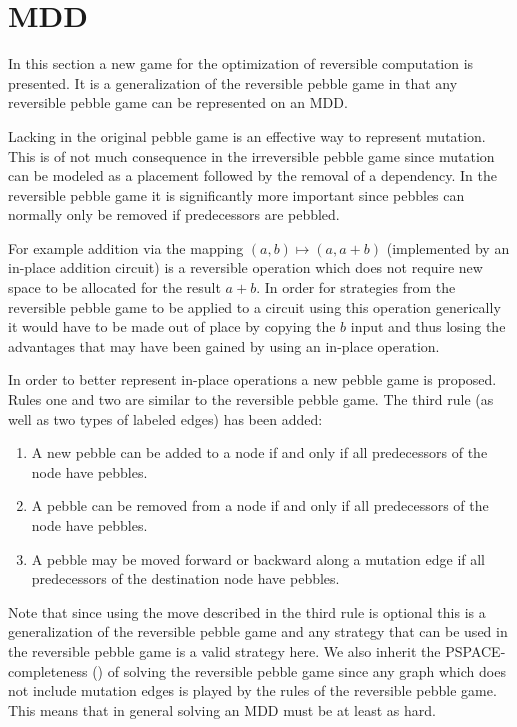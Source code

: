 \section{MDD}

In this section a new game for the optimization of reversible computation is
presented. It is a generalization of the reversible pebble game in that any
reversible pebble game can be represented on an MDD. 

Lacking in the original pebble game is an effective way to
represent mutation. This is of not much consequence in the irreversible pebble
game since mutation can be modeled as a placement followed by the removal of a
dependency. In the reversible pebble game it is significantly more important
since pebbles can normally only be removed if predecessors are pebbled.

For example addition via the mapping $(a,b) \mapsto (a,a+b)$ (implemented by an
in-place addition circuit) is a reversible operation which does not require new
space to be allocated for the result $a+b$.  In order for strategies from the
reversible pebble game to be applied to a circuit using this operation
generically it would have to be made out of place by copying the $b$ input and
thus losing the advantages that may have been gained by using an in-place
operation.

In order to better represent in-place operations a new pebble game is proposed.
Rules one and two are similar to the reversible pebble game. The third rule
(as well as two types of labeled edges) has been added:

\begin{enumerate}

   \item A new pebble can be added to a node if and only if all predecessors of
     the node have pebbles.

   \item A pebble can be removed from a node if and only if all predecessors of
     the node have pebbles.

   \item A pebble may be moved forward or backward along a mutation edge if all
     predecessors of the destination node have pebbles.

\end{enumerate}

Note that since using the move described in the third rule is optional this is
a generalization of the reversible pebble game and any strategy that can be
used in the reversible pebble game is a valid strategy here. We also inherit
the PSPACE-completeness (\cite{chan13}) of solving the reversible pebble game
since any graph which does not include mutation edges is played by the rules of
the reversible pebble game. This means that in general solving an MDD must be
at least as hard.

